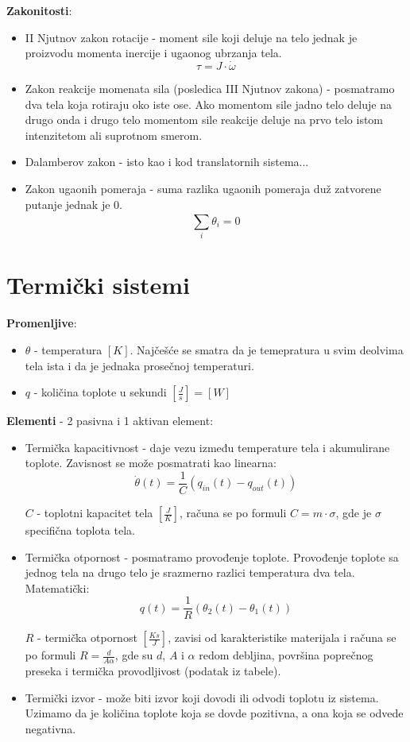 \documentclass[10pt]{report}
\begin{document}
		\textbf{Zakonitosti}:
		\begin{itemize}
			\item II Njutnov zakon rotacije - moment sile koji deluje na telo jednak je proizvodu momenta inercije i ugaonog ubrzanja tela.
			$$\tau = J \cdot \dot{\omega}$$
			\item Zakon reakcije momenata sila (posledica III Njutnov zakona) - posmatramo dva tela koja rotiraju oko iste ose. Ako momentom sile jadno telo deluje na drugo onda
			i drugo telo momentom sile reakcije deluje na prvo telo istom intenzitetom ali suprotnom smerom.
			\item Dalamberov zakon - isto kao i kod translatornih sistema...
			\item Zakon ugaonih pomeraja - suma razlika ugaonih pomeraja duž zatvorene putanje jednak je 0.
			$$\sum_{i}^{} \theta_i=0 $$
		\end{itemize}

	\section*{Termički sistemi}

		\textbf{Promenljive}:
		\begin{itemize}
			\item $\theta$ - temperatura $[K]$. Najčešće se smatra da je temepratura u svim deolvima tela ista i da je jednaka prosečnoj temperaturi.
			\item $q$ - količina toplote u sekundi $[\frac{J}{s}]=[W]$
		\end{itemize}

		\textbf{Elementi} - 2 pasivna i 1 aktivan element:
		\begin{itemize}
			\item Termička kapacitivnost - daje vezu između temperature tela i akumulirane toplote. Zavisnost se može posmatrati kao linearna:
			$$\dot{\theta}(t) = \frac{1}{C}(q_{in}(t) - q_{out}(t))$$

			$C$ - toplotni kapacitet tela $[\frac{J}{K}]$, računa se po formuli $C = m \cdot \sigma$, gde je $\sigma$ specifična toplota tela.

			\item Termička otpornost - posmatramo provođenje toplote. Provođenje toplote sa jednog tela na drugo telo je srazmerno razlici
			temperatura dva tela. Matematički:
			$$q(t) = \frac{1}{R}(\theta_2(t) - \theta_1(t))$$

			$R$ - termička otpornost $[\frac{Ks}{J}]$, zavisi od karakteristike materijala i računa se po formuli $R = \frac{d}{A\alpha}$,
			gde su $d$, $A$ i  $\alpha$ redom debljina, površina poprečnog preseka i termička provodljivost (podatak iz tabele).

			\item Termički izvor - može biti izvor koji dovodi ili odvodi toplotu iz sistema. Uzimamo da je količina toplote koja
			se dovde pozitivna, a ona koja se odvede negativna.

		\end{itemize}
\end{document}
